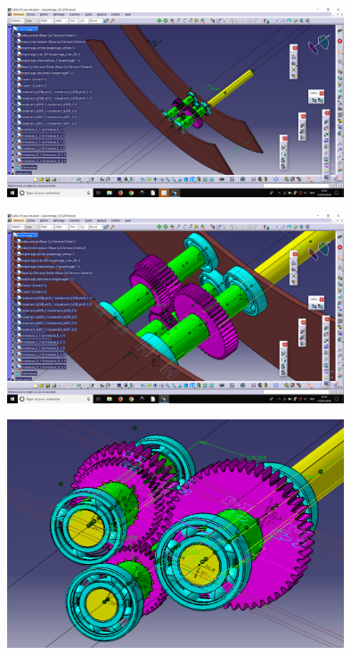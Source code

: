\documentclass{config}
\begin{document}
\begin{spacing}{1.2}
\begin{center}
\includegraphics[width=0.75\textwidth]{vue3D_BE.png}
\end{center}

\begin{center}
\includegraphics[width=0.75\textwidth]{vue_3D_BE_Zoom.png}
\end{center}

\begin{center}
\includegraphics[width=0.75\textwidth]{Vue_3D_sans_carter.PNG}
\end{center}


\end{spacing}
\end{document}
